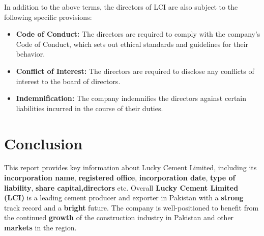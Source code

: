 \documentclass{article}
\begin{document}
 \vspace{22pt}
In addition to the above terms, the directors of LCI are also subject to the following specific provisions:

 \vspace{22pt}
\begin{itemize}
  \item \textbf{Code of Conduct:} The directors are required to comply with the company's Code of Conduct, which sets out ethical standards and guidelines for their behavior.
  \item \textbf{Conflict of Interest:} The directors are required to disclose any conflicts of interest to the board of directors.
  \item \textbf{Indemnification:} The company indemnifies the directors against certain liabilities incurred in the course of their duties.
\end{itemize}

\ClearShipoutPictureBG



\newpage
\color{black}
\section{Conclusion}
 \vspace{22pt}
This report provides key information about Lucky Cement Limited, including its  \textbf{incorporation name},  \textbf{registered office},  \textbf{incorporation date},  \textbf{type of liability}, \textbf{share capital,directors} etc. Overall 
 \textbf{Lucky Cement Limited (LCI)} is a leading cement producer and exporter in Pakistan with a  \textbf{strong} track record and a  \textbf{bright} future. The company is well-positioned to benefit from the continued  \textbf{growth} of the construction industry in Pakistan and other  \textbf{markets} in the region.
\end{document}
